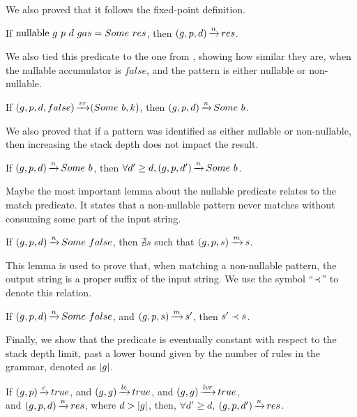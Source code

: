 We also proved that it follows
the fixed-point definition.

\begin{lemma}
    If $\text{nullable}\ g\ p\ d\ gas = Some\ res$,
    then $(g,p,d) \operatorname{\xrightarrow{\mathit{n}}} res$.
\end{lemma}

We also tied this predicate to the
one from ,
showing how similar they are,
when the nullable accumulator is $false$,
and the pattern is either nullable or non-nullable.

\begin{lemma}%
    If $(g,p,d,false) \operatorname{\xrightarrow{\mathit{vr}}} (Some\ b,k)$,
    then $(g,p,d) \operatorname{\xrightarrow{\mathit{n}}} Some\ b$.
\end{lemma}

We also proved that if a pattern
was identified as either nullable or non-nullable,
then increasing the stack depth does not impact the result.

\begin{lemma}%
    If $(g,p,d) \operatorname{\xrightarrow{\mathit{n}}} Some\ b$,
    then $\forall d' \ge d, (g,p,d') \operatorname{\xrightarrow{\mathit{n}}} Some\ b$.
\end{lemma}

Maybe the most important lemma
about the nullable predicate
relates to the match predicate.
It states that a non-nullable pattern
never matches without consuming
some part of the input string.

\begin{lemma}%
    If $(g,p,d) \operatorname{\xrightarrow{\mathit{n}}} Some\ false$,
    then $\nexists s$ such that $(g,p,s) \operatorname{\xrightarrow{\mathit{m}}} s$.
\end{lemma}

This lemma is used to prove that,
when matching a non-nullable pattern,
the output string is a proper suffix of the input string.
We use the symbol ``$\prec$''
to denote this relation.

\begin{lemma}%
    \label{lemma:non-nullable-pattern-proper-suffix}
    If $(g,p,d) \operatorname{\xrightarrow{\mathit{n}}} Some\ false$,
    and $(g,p,s) \operatorname{\xrightarrow{\mathit{m}}} s'$,
    then $s' \prec s$.
\end{lemma}

Finally, we show that the predicate is
eventually constant
with respect to the stack depth limit,
past a lower bound given by the number of rules in the grammar,
denoted as $|g|$.

\begin{lemma}%
    If $(g,p) \operatorname{\xrightarrow{\mathit{c}}} true$,
    and $(g,g) \operatorname{\xrightarrow{\mathit{lc}}} true$,
    and $(g,g) \operatorname{\xrightarrow{\mathit{lvr}}} true$, \\
    and $(g,p,d) \operatorname{\xrightarrow{\mathit{n}}} res$,
    where $d > |g|$,
    then, $\forall d' \ge d$,
    $(g,p,d') \operatorname{\xrightarrow{\mathit{n}}} res$.
\end{lemma}
